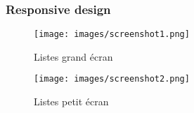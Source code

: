 \begin{frame}
\frametitle{Responsive design}
	\begin{multicols}{2}
		\begin{figure}[!h]
			\begin{center}
				\texttt{[image: images/screenshot1.png]}

				\caption{Listes grand écran }
			\end{center}
		\end{figure}
		\begin{figure}[!h]
			\begin{center}
				\texttt{[image: images/screenshot2.png]}
				\caption{Listes petit écran }
			\end{center}
		\end{figure}
	\end{multicols}

\end{frame}

